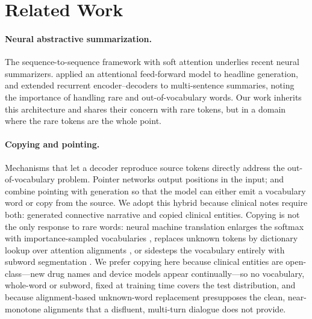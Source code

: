 \documentclass{article}
\begin{document}
\section{Related Work}

\paragraph{Neural abstractive summarization.} The sequence-to-sequence framework
\citep{Sutskever2014,Cho2014} with soft attention \citep{Bahdanau2015} underlies
recent neural summarizers. \citet{Rush2015} applied an attentional feed-forward
model to headline generation, and \citet{Nallapati2016} extended recurrent
encoder--decoders to multi-sentence summaries, noting the importance of handling
rare and out-of-vocabulary words. Our work inherits this architecture and shares
their concern with rare tokens, but in a domain where the rare tokens are the whole
point.

\paragraph{Copying and pointing.} Mechanisms that let a decoder reproduce source
tokens directly address the out-of-vocabulary problem. Pointer networks
\citep{Vinyals2015} output positions in the input; \citet{Gulcehre2016} and
\citet{Gu2016} combine pointing with generation so that the model can either emit a
vocabulary word or copy from the source. We adopt this hybrid because clinical notes
require both: generated connective narrative and copied clinical entities. Copying is
not the only response to rare words: neural machine translation enlarges the softmax
with importance-sampled vocabularies \citep{Jean2015}, replaces unknown tokens by
dictionary lookup over attention alignments \citep{Luong2015rare}, or sidesteps the
vocabulary entirely with subword segmentation \citep{Sennrich2016}. We prefer copying
here because clinical entities are open-class---new drug names and device models
appear continually---so no vocabulary, whole-word or subword, fixed at training time
covers the test distribution, and because alignment-based unknown-word replacement
presupposes the clean, near-monotone alignments that a disfluent, multi-turn dialogue
does not provide.
\end{document}
